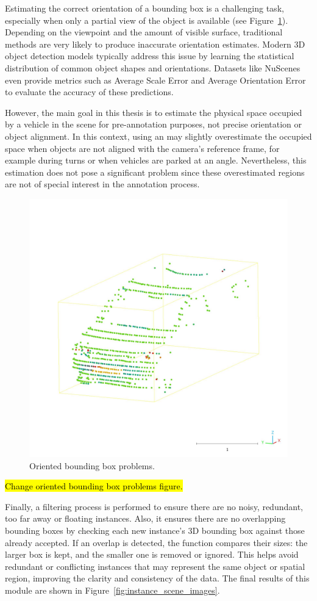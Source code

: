 Estimating the correct orientation of a bounding box is a challenging task, especially when only a partial view of the object is available (see Figure~\ref{fig:oriented_bounding_box_problems}). Depending on the viewpoint and the amount of visible surface, traditional methods are very likely to produce inaccurate orientation estimates. Modern 3D object detection models typically address this issue by learning the statistical distribution of common object shapes and orientations. Datasets like NuScenes even provide metrics such as Average Scale Error and Average Orientation Error to evaluate the accuracy of these predictions.

However, the main goal in this thesis is to estimate the physical space occupied by a vehicle in the scene for pre-annotation purposes, not precise orientation or object alignment. In this context, using an  may slightly overestimate the occupied space when objects are not aligned with the camera's reference frame, for example during turns or when vehicles are parked at an angle. Nevertheless, this estimation does not pose a significant problem since these overestimated regions are not of special interest in the annotation process.

\begin{figure}[h!]
    \centering
    \includegraphics[width=0.5\linewidth]{images/methodology/oriendet_bbox_problem_aux.jpeg}
    \caption{Oriented bounding box problems.}
    \label{fig:oriented_bounding_box_problems}
\end{figure}

\hl{Change oriented bounding box problems figure.}

Finally, a filtering process is performed to ensure there are no noisy, redundant, too far away or floating instances. Also, it ensures there are no overlapping bounding boxes by checking each new instance's 3D bounding box against those already accepted. If an overlap is detected, the function compares their sizes: the larger box is kept, and the smaller one is removed or ignored. This helps avoid redundant or conflicting instances that may represent the same object or spatial region, improving the clarity and consistency of the data. The final results of this module are shown in Figure~\ref{fig:instance_scene_images}.

